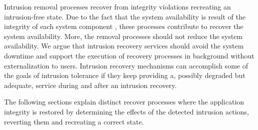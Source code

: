 Intrusion removal processes recover from integrity violations recreating an intrusion-free state. Due to the fact that the system availability is result of the integrity of each system component \cite{Wang2007}, these processes contribute to recover the system availability. More, the removal processes should not reduce the system availability. We argue that intrusion recovery services should avoid the system downtime and support the execution of recovery processes in background without externalization to users. Intrusion recovery mechanisms can accomplish some of the goals of intrusion tolerance if they keep providing a, possibly degraded but adequate, service during and after an intrusion recovery.

The following sections explain distinct recover processes where the application integrity is restored by determining the effects of the detected intrusion actions, reverting them and recreating a correct state. 